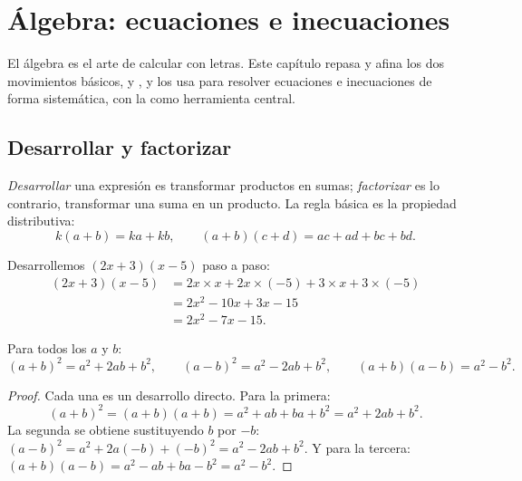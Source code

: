 \chapter{Álgebra: ecuaciones e inecuaciones}\label{ch:g10:algebra}

El álgebra es el arte de calcular con letras. Este capítulo repasa y afina
los dos movimientos básicos,  y , y los usa para
resolver ecuaciones e inecuaciones de forma sistemática, con la  como herramienta central.

\section{Desarrollar y factorizar}

\begin{definition}\label{def:g10:algebra:expand}
\emph{Desarrollar} una expresión es transformar
productos en sumas; \emph{factorizar} es lo contrario,
transformar una suma en un producto. La regla básica es la propiedad
distributiva:
\[
k(a + b) = ka + kb,
\qquad
(a + b)(c + d) = ac + ad + bc + bd .
\]
\end{definition}

\begin{example}\label{ex:g10:algebra:expand}
Desarrollemos $(2x + 3)(x - 5)$ paso a paso:
\begin{align*}
(2x + 3)(x - 5)
&= 2x \times x + 2x \times (-5) + 3 \times x + 3 \times (-5) \\
&= 2x^2 - 10x + 3x - 15 \\
&= 2x^2 - 7x - 15 .
\end{align*}
\end{example}

\begin{theorem}\label{thm:g10:algebra:identities}
Para todos los  $a$ y $b$:
\[
(a+b)^2 = a^2 + 2ab + b^2,
\qquad
(a-b)^2 = a^2 - 2ab + b^2,
\qquad
(a+b)(a-b) = a^2 - b^2 .
\]
\end{theorem}

\begin{proof}
Cada una es un desarrollo directo. Para la primera:
\[
(a+b)^2 = (a+b)(a+b) = a^2 + ab + ba + b^2 = a^2 + 2ab + b^2 .
\]
La segunda se obtiene sustituyendo $b$ por $-b$: $(a-b)^2 = a^2 + 2a(-b) +
(-b)^2 = a^2 - 2ab + b^2$. Y para la tercera:
$(a+b)(a-b) = a^2 - ab + ba - b^2 = a^2 - b^2$.
\end{proof}

